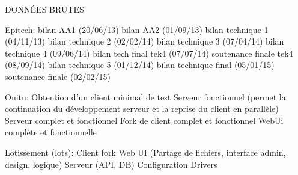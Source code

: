 DONNÉES BRUTES


Epitech:
bilan AA1 (20/06/13)
bilan AA2 (01/09/13)
bilan technique 1 (04/11/13)
bilan technique 2 (02/02/14)
bilan technique 3 (07/04/14)
bilan technique 4 (09/06/14)
bilan tech final tek4 (07/07/14)
soutenance finale tek4 (08/09/14)
bilan technique 5 (01/12/14)
bilan technique final (05/01/15)
soutenance finale (02/02/15)


Onitu:
Obtention d'un client minimal de test
Serveur fonctionnel (permet la continuation du développement serveur et la reprise du client en parallèle)
Serveur complet et fonctionnel
Fork de client complet et fonctionnel
WebUi complète et fonctionnelle


Lotissement (lots):
Client fork
Web UI (Partage de fichiers, interface admin, design, logique)
Serveur (API, DB)
Configuration
Drivers